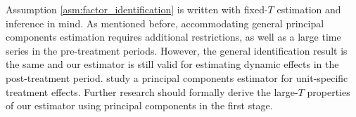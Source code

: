 Assumption \ref{asm:factor_identification} is written with fixed-$T$ estimation and inference in mind. As mentioned before, accommodating general principal components estimation requires additional restrictions, as well as a large time series in the pre-treatment periods. However, the general identification result is the same and our estimator is still valid for estimating dynamic effects in the post-treatment period. \citet{Chan_and_Kwok_2022} study a principal components estimator for unit-specific treatment effects. Further research should formally derive the large-$T$ properties of our estimator using principal components in the first stage. 

